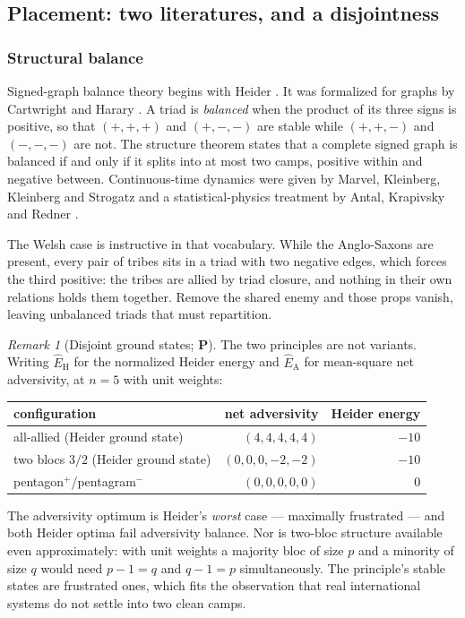 \documentclass[11pt]{article}
\numberwithin{equation}{section}
\theoremstyle{plain}
\theoremstyle{definition}
\theoremstyle{remark}
\newtheorem{remark}[theorem]{Remark}
\begin{document}
\subsection{Placement: two literatures, and a disjointness}
\label{ad:sub:placement}

\subsubsection{Structural balance}\label{ad:subsub:heider}

Signed-graph balance theory begins with Heider \cite{Hei46}. It was
formalized for graphs by Cartwright and Harary \cite{CH56}. A triad is
\emph{balanced} when the product of its three signs is positive, so that
$(+,+,+)$ and $(+,-,-)$ are stable while $(+,+,-)$ and $(-,-,-)$ are
not. The structure theorem states that a complete signed graph is
balanced if and only if it splits into at most two camps, positive
within and negative between. Continuous-time dynamics were given by
Marvel, Kleinberg, Kleinberg and Strogatz \cite{MKKS11} and a
statistical-physics treatment by Antal, Krapivsky and Redner
\cite{AKR05}.

The Welsh case is instructive in that vocabulary. While the
Anglo-Saxons are present, every pair of tribes sits in a triad with two
negative edges, which forces the third positive: the tribes are allied
by triad closure, and nothing in their own relations holds them
together. Remove the shared enemy and those props vanish, leaving
unbalanced triads that must repartition.

\begin{remark}[Disjoint ground states; \textbf{P}]
\label{ad:rem:disjoint}
The two principles are not variants. Writing $\hat E_{\mathrm H}$ for
the normalized Heider energy and $\hat E_{\mathrm A}$ for mean-square
net adversivity, at $n=5$ with unit weights:
\begin{center}\small
\begin{tabular}{@{}lrr@{}}
\toprule
configuration & net adversivity & Heider energy\\
\midrule
all-allied (Heider ground state) & $(4,4,4,4,4)$ & $-10$\\
two blocs $3/2$ (Heider ground state) & $(0,0,0,-2,-2)$ & $-10$\\
pentagon$^{+}$/pentagram$^{-}$ & $(0,0,0,0,0)$ & $0$\\
\bottomrule
\end{tabular}
\end{center}
The adversivity optimum is Heider's \emph{worst} case --- maximally
frustrated --- and both Heider optima fail adversivity balance. Nor is
two-bloc structure available even approximately: with unit weights a
majority bloc of size $p$ and a minority of size $q$ would need
$p-1=q$ and $q-1=p$ simultaneously. The principle's stable states are
frustrated ones, which fits the observation that real international
systems do not settle into two clean camps.
\end{remark}
\end{document}
